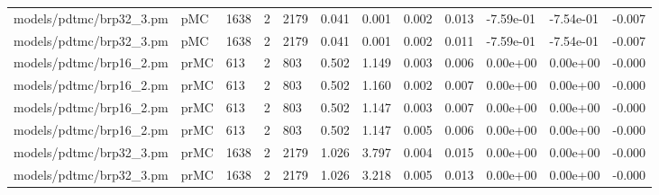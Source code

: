 \begin{tabular}{llllllllllll}
models/pdtmc/brp32\_3.pm &  pMC &   1638 &          2 &        2179 &    0.041 &            0.001 &                        0.002 &          0.013 &        -7.59e-01 &       -7.54e-01 &       -0.007 \\
models/pdtmc/brp32\_3.pm &  pMC &   1638 &          2 &        2179 &    0.041 &            0.001 &                        0.002 &          0.011 &        -7.59e-01 &       -7.54e-01 &       -0.007 \\
models/pdtmc/brp16\_2.pm & prMC &    613 &          2 &         803 &    0.502 &            1.149 &                        0.003 &          0.006 &         0.00e+00 &        0.00e+00 &       -0.000 \\
models/pdtmc/brp16\_2.pm & prMC &    613 &          2 &         803 &    0.502 &            1.160 &                        0.002 &          0.007 &         0.00e+00 &        0.00e+00 &       -0.000 \\
models/pdtmc/brp16\_2.pm & prMC &    613 &          2 &         803 &    0.502 &            1.147 &                        0.003 &          0.007 &         0.00e+00 &        0.00e+00 &       -0.000 \\
models/pdtmc/brp16\_2.pm & prMC &    613 &          2 &         803 &    0.502 &            1.147 &                        0.005 &          0.006 &         0.00e+00 &        0.00e+00 &       -0.000 \\
models/pdtmc/brp32\_3.pm & prMC &   1638 &          2 &        2179 &    1.026 &            3.797 &                        0.004 &          0.015 &         0.00e+00 &        0.00e+00 &       -0.000 \\
models/pdtmc/brp32\_3.pm & prMC &   1638 &          2 &        2179 &    1.026 &            3.218 &                        0.005 &          0.013 &         0.00e+00 &        0.00e+00 &       -0.000 \\
\bottomrule
\end{tabular}
